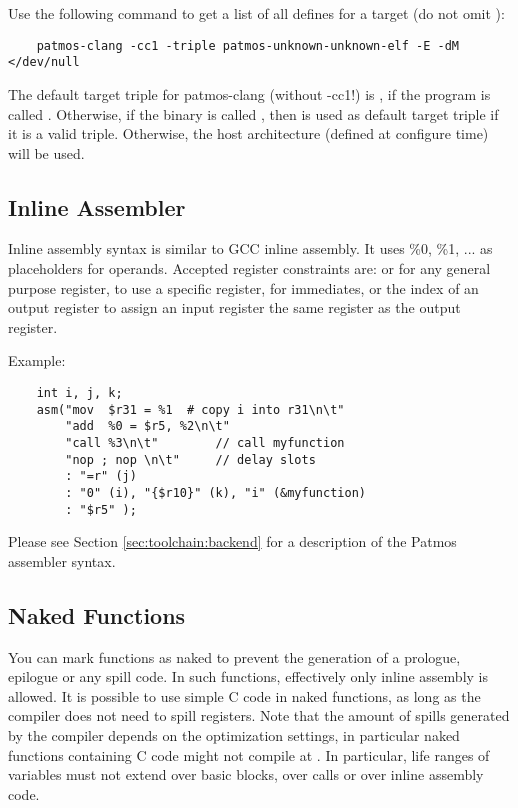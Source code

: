 Use the following command to get a list of all defines for a target (do not omit ):

\begin{verbatim}
    patmos-clang -cc1 -triple patmos-unknown-unknown-elf -E -dM </dev/null
\end{verbatim}

The default target triple for patmos-clang (without -cc1!) is ,
if the program is called . Otherwise, if the binary is called
, then  is used as default target triple if it is a valid triple.
Otherwise, the host architecture (defined at configure time) will be used.


\subsection{Inline Assembler}

Inline assembly syntax is similar to GCC inline assembly. It uses \%0, \%1, ... as placeholders for
operands. Accepted register constraints are:  or  for any general purpose register,
 to use a specific register,  for immediates, or the index of an output register to
assign an input register the same register as the output register.

Example:
\begin{verbatim}
    int i, j, k;
    asm("mov  $r31 = %1  # copy i into r31\n\t"
        "add  %0 = $r5, %2\n\t"
        "call %3\n\t"        // call myfunction
        "nop ; nop \n\t"     // delay slots
        : "=r" (j)
        : "0" (i), "{$r10}" (k), "i" (&myfunction)
        : "$r5" );
\end{verbatim}

Please see Section \ref{sec:toolchain:backend} for a description of the Patmos assembler syntax.

\subsection{Naked Functions}

You can mark functions as naked to prevent the generation of a prologue, epilogue or any spill code.
In such functions, effectively only inline assembly is allowed. It is possible to use simple C code in naked 
functions, as long as the compiler does not need to spill registers. Note that the amount of spills generated by
the compiler depends on the optimization settings, in particular naked functions containing C code might not compile at
. In particular, life ranges of variables must not extend over basic blocks, over calls or over
inline assembly code.

